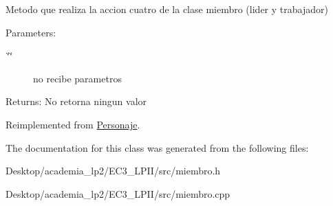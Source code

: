 Metodo que realiza la accion cuatro de la clase miembro (lider y trabajador) \begin{Desc}
\item[Parameters:]
\begin{description}
\item[{\em \char`\"{}\char`\"{}}]no recibe parametros \end{description}
\end{Desc}
\begin{Desc}
\item[Returns:]No retorna ningun valor \end{Desc}


Reimplemented from \hyperlink{classPersonaje_3aed5959a6a829819e0b0a6dcca9c2e4}{Personaje}.

The documentation for this class was generated from the following files:\begin{CompactItemize}
\item 
Desktop/academia\_\-lp2/EC3\_\-LPII/src/miembro.h\item 
Desktop/academia\_\-lp2/EC3\_\-LPII/src/miembro.cpp\end{CompactItemize}
